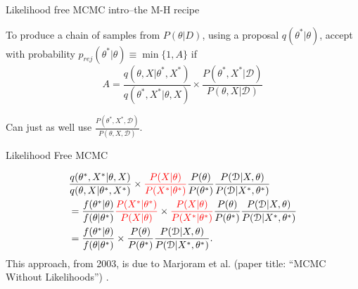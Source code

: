 \documentclass[12pt,a4paper,t,xcolor=dvipsnames,slidestop,compress,mathserif]{beamer}
\newcommand{\red}[1]{{\color{red}#1}}
\begin{document}
%
%
%
%
%


\begin{frame}{Likelihood free MCMC intro--the M-H recipe}

To produce a chain of samples from $P(\theta|D)$, using a proposal $q(\theta^*|\theta)$, accept with probability $p_{rej}(\theta^*|\theta)\equiv\min \{1, A\}$ if $$A=\frac{q(\theta,X|\theta^*,X^*)}{q(\theta^*,X^*|\theta,X)} \times \frac{P(\theta^*,X^*|\mathcal{D})}{P(\theta,X|\mathcal{D})}
$$

Can just as well use $\frac{P(\theta^*,X^*,\mathcal{D})}{P(\theta,X,\mathcal{D})}$.

\end{frame}
\begin{frame}{Likelihood Free MCMC}

\begin{align*}
&\frac{q(\theta^*, X^*|\theta, X)}{q(\theta, X|\theta^*, X^*)}
\times 
\red{\frac{P(X| \theta)}{P(X^*| \theta^*)}} 
\frac{ P( \theta)}{ P( \theta^*)} 
\frac{P(\mathcal{D}|X, \theta)}{P(\mathcal{D}|X^*, \theta^*)}\\
&=\frac{f(\theta^*|\theta)}{f(\theta|\theta^*)}
\red{\frac{P(X^*| \theta^*)}{P(X| \theta)} }
\times 
\red{\frac{P(X| \theta)}{P(X^*| \theta^*)} } 
\frac{ P( \theta)}{ P( \theta^*)}
\frac{P(\mathcal{D}|X, \theta)}{P(\mathcal{D}|X^*, \theta^*)}\\
&=\frac{f(\theta^*|\theta)}{f(\theta|\theta^*)}
\times 
\frac{ P( \theta)}{ P( \theta^*)} 
\frac{P(\mathcal{D}|X, \theta)}{P(\mathcal{D}|X^*, \theta^*)}.
\end{align*}
This approach, from 2003, is due to Marjoram et al. (paper title: ``MCMC Without Likelihoods'') \cite{Marjoram23122003}. 
\end{frame}
\end{document}

